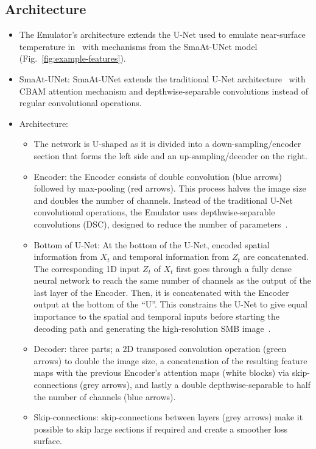 \documentclass[a4paper,11pt,oneside]{report}
\begin{document}
\subsection{Architecture}
\begin{itemize}
    \item The Emulator's architecture extends the U-Net used to emulate near-surface temperature in~\cite{Doury} with mechanisms from the SmaAt-UNet model~\cite{smatunet} (Fig.~\ref{fig:example-features}).
     \item SmaAt-UNet: SmaAt-UNet extends the traditional U-Net architecture~\cite{unet} with CBAM attention mechanism and depthwise-separable convolutions instead of regular convolutional operations. 
    \item Architecture: 
    \begin{itemize}
    \item The network is U-shaped as it is divided into a down-sampling/encoder section that forms the left side and an up-sampling/decoder on the right.
    \item Encoder: the Encoder consists of double convolution (blue arrows) followed by max-pooling (red arrows). This process halves the image size and doubles the number of channels. Instead of the traditional U-Net convolutional operations, the Emulator uses depthwise-separable convolutions (DSC), designed to reduce the number of parameters~\cite{smatunet}.
    \item Bottom of U-Net: At the bottom of the U-Net, encoded spatial information from $X_t$ and temporal information from $Z_t$ are concatenated. The corresponding 1D input $Z_t$ of $X_t$ first goes through a fully dense neural network to reach the same number of channels as the output of the last layer of the Encoder. Then, it is concatenated with the Encoder output at the bottom of the “U”. This constrains the U-Net to give equal importance to the spatial and temporal inputs before starting the decoding path and generating the high-resolution SMB image~\cite{Doury}. 
    \item Decoder: three parts; a 2D transposed convolution operation (green arrows) to double the image size, a concatenation of the resulting feature maps with the previous Encoder’s attention maps (white blocks) via skip-connections (grey arrows), and lastly a double depthwise-separable to half the number of channels (blue arrows). 
    \item Skip-connections: skip-connections between layers (grey arrows) make it possible to skip large sections if required and create a smoother loss surface. 

\end{itemize}
\end{itemize}
\end{document}
